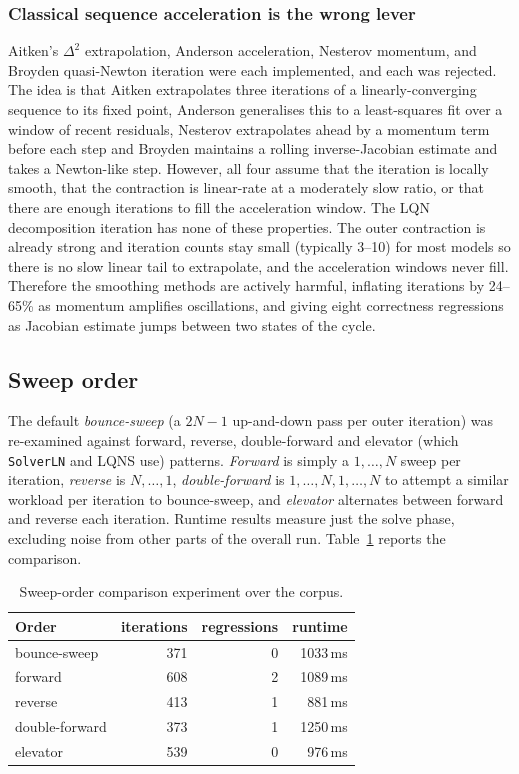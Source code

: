 \subsubsection*{Classical sequence acceleration is the wrong lever}

Aitken's $\Delta^2$ extrapolation, Anderson acceleration, Nesterov momentum, and Broyden quasi-Newton iteration \cite{saad2003} were each implemented, and each was rejected. The idea is that Aitken extrapolates three iterations of a linearly-converging sequence to its fixed point, Anderson generalises this to a least-squares fit over a window of recent residuals, Nesterov extrapolates ahead by a momentum term before each step and Broyden maintains a rolling inverse-Jacobian estimate and takes a Newton-like step. However, all four assume that the iteration is locally smooth, that the contraction is linear-rate at a moderately slow ratio, or that there are enough iterations to fill the acceleration window. The LQN decomposition iteration has none of these properties. The outer contraction is already strong and iteration counts stay small (typically 3--10) for most models so there is no slow linear tail to extrapolate, and the acceleration windows never fill. Therefore the smoothing methods are actively harmful, inflating iterations by 24--65\% as momentum amplifies oscillations, and giving eight correctness regressions as Jacobian estimate jumps between two states of the cycle. 

\subsection{Sweep order}

The default \emph{bounce-sweep} (a $2N-1$ up-and-down pass per outer iteration) was re-examined against forward, reverse, double-forward and elevator (which \texttt{SolverLN} and LQNS use) patterns. \emph{Forward} is simply a $1,\dots,N$ sweep per iteration, \emph{reverse} is $N,\dots,1$, \emph{double-forward} is $1,\dots,N,1,\dots,N$ to attempt a similar workload per iteration to bounce-sweep, and \emph{elevator} alternates between forward and reverse each iteration. Runtime results measure just the solve phase, excluding noise from other parts of the overall run. Table~\ref{tab:DRAFT-sweep} reports the comparison.

\begin{table}[!ht]\centering
\small
\begin{tabular}{lrrr}
\hline
Order & iterations & regressions & runtime \\
\hline
bounce-sweep & 371 & 0 & 1033\,ms \\
forward & 608 & 2 & 1089\,ms \\
reverse & 413 & 1 & 881\,ms \\
double-forward & 373 & 1 & 1250\,ms \\
elevator & 539 & 0 & 976\,ms \\
\hline
\end{tabular}
\caption{Sweep-order comparison experiment over the corpus.}
\label{tab:DRAFT-sweep}
\end{table}

